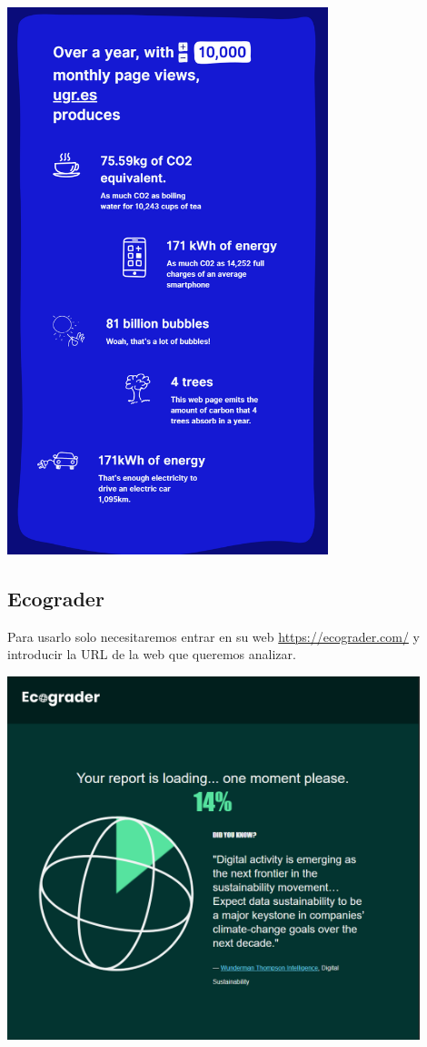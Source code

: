 \documentclass[12pt,a4paper]{report}
\begin{document}
\begin{center}
  \includegraphics[width=0.7\textwidth]{imagenes/WCC_3.png}
\end{center}

\subsection{Ecograder}
Para usarlo solo necesitaremos entrar en su web \url{https://ecograder.com/} y
introducir la URL de la web que queremos analizar.

\begin{center}
  \includegraphics[width=0.9\textwidth]{imagenes/Ecograder_1.png}
\end{center}
\end{document}
